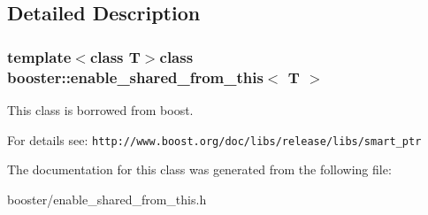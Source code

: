 \subsection{\-Detailed \-Description}
\subsubsection*{template$<$class \-T$>$class booster\-::enable\-\_\-shared\-\_\-from\-\_\-this$<$ T $>$}

\-This class is borrowed from boost. 

\-For details see\-: {\tt http\-://www.\-boost.\-org/doc/libs/release/libs/smart\-\_\-ptr} 

\-The documentation for this class was generated from the following file\-:\begin{DoxyCompactItemize}
\item 
booster/enable\-\_\-shared\-\_\-from\-\_\-this.\-h\end{DoxyCompactItemize}
